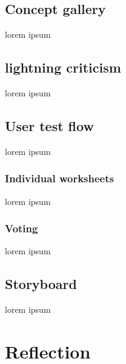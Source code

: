 \documentclass[12pt]{article}
\begin{document}
\subsection{Concept gallery}
lorem ipsum
\subsection{lightning criticism}
lorem ipsum
\subsection{User test flow}
lorem ipsum
\subsubsection{Individual worksheets}
lorem ipsum
\subsubsection{Voting}
lorem ipsum
\subsection{Storyboard}
lorem ipsum

\section{Reflection}



\printbibliography
\end{document}
